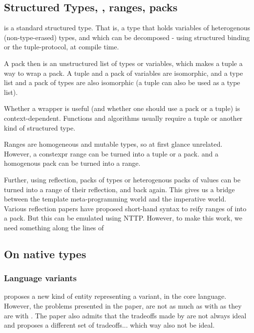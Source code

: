 \documentclass{wg21}
\begin{document}
\subsection{Structured Types, , ranges, packs}

 is a standard structured type. That is, a type that holds variables of heterogenous (non-type-erased) types,
and which can be decomposed - using structured binding or the tuple-protocol, at compile time.

A pack then is an unstructured list of types or variables, which makes a tuple a way to wrap a pack.
A tuple and a pack of variables are isomorphic, and a type list and a pack of types are also isomorphic (a tuple can also be used as a type list).

Whether a wrapper is useful (and whether one should use a pack or a tuple) is context-dependent.
Functions and algorithms usually require a tuple or another kind of structured type.

Ranges are homogeneous and mutable types, so at first glance unrelated.
However, a constexpr range can be turned into a tuple or a pack. and a homogenous pack can be turned into a range.

Further, using reflection, packs of types or heterogenous packs of values can be turned into a range of their reflection, and back again.
This gives us a bridge between the template meta-programming world and the imperative world.
Various reflection papers have proposed short-hand syntax to reify ranges of  into a pack.
But this can be emulated using NTTP.
However, to make this work, we need something along the lines of 

\subsection{On native types}

\subsubsection{Language variants}

 proposes a new kind of entity representing a variant, in the core language.
However, the problems presented in the paper, are not as much as with  as they are with .
The paper also admits that the tradeoffs made by  are not always ideal and proposes a different set of tradeoffs... which
way also not be ideal.
\end{document}
